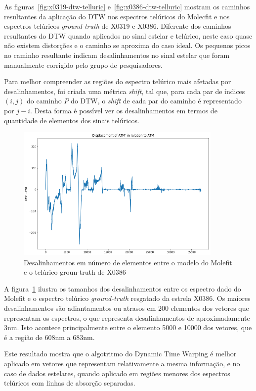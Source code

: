 As figuras~\ref{fig:x0319-dtw-telluric} e~\ref{fig:x0386-dtw-telluric} mostram os caminhos resultantes da aplicação do DTW nos espectros telúricos do Molecfit e nos espectros telúricos \textit{ground-truth} de X0319 e X0386. Diferente dos caminhos resultantes do DTW quando aplicados no sinal estelar e telúrico, neste caso quase não existem distorções e o caminho se aproxima do caso ideal. Os pequenos picos no caminho resultante indicam desalinhamentos no sinal estelar que foram manualmente corrigido pelo grupo de pesquisadores. 

Para melhor compreender as regiões do espectro telúrico mais afetadas por desalinhamentos, foi criada uma métrica \textit{shift}, tal que, para cada par de índices $(i,j)$ do caminho $P$ do DTW, o \textit{shift} de cada par do caminho é representado por $j - i$. Desta forma é possível ver os desalinhamentos em termos de quantidade de elementos dos sinais telúricos.

\begin{figure}[htb]
\centering
\includegraphics[width=10cm]{figuras/x0386_displacement.png}
\caption{Desalinhamentos em número de elementos entre o modelo do Molefit e o telúrico groun-truth de X0386}
\label{fig:x0386-displacement}
\end{figure}

A figura~\ref{fig:x0386-displacement} ilustra os tamanhos dos desalinhamentos entre os espectro dado do Molefit e o espectro telúrico \textit{ground-truth} resgatado da estrela X0386. Os maiores desalinhamentos são adiantamentos ou atrasos em 200 elementos dos vetores que representam os espectros, o que representa desalinhamentos de aproximadamente 3nm. Isto acontece principalmente entre o elemento 5000 e 10000 dos vetores, que é a região de 608nm a 683nm.

Este resultado mostra que o algotritmo do Dynamic Time Warping é melhor aplicado em vetores que representam relativamente a mesma informação, e no caso de dados estelares, quando aplicado em regiões menores dos espectros telúricos com linhas de absorção separadas. 

